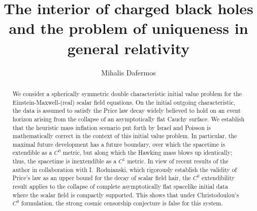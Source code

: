 \documentclass{article}
\begin{document}
                        

\title{The interior of charged black holes and the problem of uniqueness
		in general relativity}              
		
\author{Mihalis Dafermos}                       
\maketitle   

\begin{abstract}
      We consider a spherically
symmetric double characteristic initial value problem
for the Einstein-Maxwell-(real) scalar field equations.
On the initial outgoing characteristic, the data
is assumed to satisfy the Price law decay
widely believed to hold on an event horizon
arising from the collapse of an asymptotically
flat Cauchy surface. We establish
that the heuristic mass inflation scenario put forth by Israel 
and Poisson is mathematically correct in the context of
this initial value problem. In particular, 
the maximal future development has a future boundary,
over which the spacetime is extendible as a $C^0$ metric,
but along which the Hawking mass blows up identically;
thus, the spacetime is inextendible as a $C^1$ metric. 
In view of recent results of the author in collaboration
with I.~Rodnianski, which 
rigorously establish the validity of Price's law as an upper
bound for the decay of scalar field hair, 
the $C^0$ extendibility result applies to the 
collapse of complete asymptotically flat spacelike initial data
where the scalar field is compactly supported. This shows
that under Christodoulou's $C^0$ formulation, the strong cosmic
censorship conjecture is false for this system.
\end{abstract}


 \tableofcontents
\end{document}
